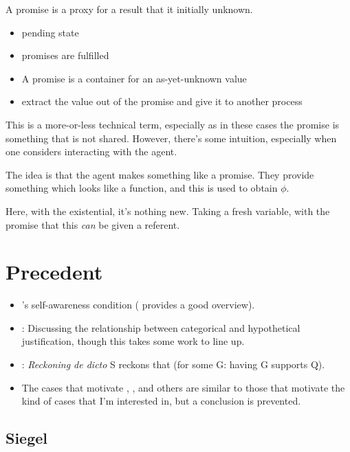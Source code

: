 \documentclass[10pt]{article}
\begin{document}
A promise is a proxy for a result that it initially unknown.

\begin{itemize}
\item pending state
\item promises are fulfilled
\item A promise is a container for an as-yet-unknown value
\item extract the value out of the promise and give it to another process
\end{itemize}


This is a more-or-less technical term, especially as in these cases the promise is something that is not shared.
However, there's some intuition, especially when one considers interacting with the agent.

The idea is that the agent makes something like a promise.
They provide something which looks like a function, and this is used to obtain \(\phi\).

Here, with the existential, it's nothing new.
Taking a fresh variable, with the promise that this \emph{can} be given a referent.



\section{Precedent}
\label{sec:precedent}

\begin{itemize}
\item \citeauthor{Boghossian:2014aa}'s self-awareness condition (\citeauthor{Siegel:2019aa} provides a good overview).
\item \textcite{Pryor:2018aa}: Discussing the relationship between categorical and hypothetical justification, though this takes some work to line up.
\item \textcite{Siegel:2019aa}: \emph{Reckoning de dicto} S reckons that (for some G: having G supports Q).
\item The cases that motivate \textcite{Worsnip:2018aa}, \textcite{Fogal:2019aa}, and others are similar to those that motivate the kind of cases that I'm interested in, but a conclusion is prevented.
\end{itemize}

\subsection{Siegel}
\label{sec:siegel}
\end{document}
